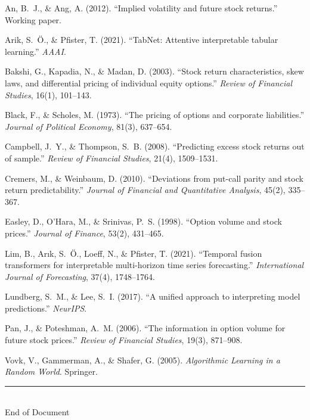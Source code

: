\documentclass[11pt,a4paper]{article}
\begin{document}
\begin{enumerate}[nosep, label={[\arabic*]}]
    \item An, B.~J., \& Ang, A. (2012). ``Implied volatility and future stock returns.'' Working paper.
    \item Arik, S.~\"O., \& Pfister, T. (2021). ``TabNet: Attentive interpretable tabular learning.'' \textit{AAAI}.
    \item Bakshi, G., Kapadia, N., \& Madan, D. (2003). ``Stock return characteristics, skew laws, and differential pricing of individual equity options.'' \textit{Review of Financial Studies}, 16(1), 101--143.
    \item Black, F., \& Scholes, M. (1973). ``The pricing of options and corporate liabilities.'' \textit{Journal of Political Economy}, 81(3), 637--654.
    \item Campbell, J.~Y., \& Thompson, S.~B. (2008). ``Predicting excess stock returns out of sample.'' \textit{Review of Financial Studies}, 21(4), 1509--1531.
    \item Cremers, M., \& Weinbaum, D. (2010). ``Deviations from put-call parity and stock return predictability.'' \textit{Journal of Financial and Quantitative Analysis}, 45(2), 335--367.
    \item Easley, D., O'Hara, M., \& Srinivas, P.~S. (1998). ``Option volume and stock prices.'' \textit{Journal of Finance}, 53(2), 431--465.
    \item Lim, B., Ar\i k, S.~\"O., Loeff, N., \& Pfister, T. (2021). ``Temporal fusion transformers for interpretable multi-horizon time series forecasting.'' \textit{International Journal of Forecasting}, 37(4), 1748--1764.
    \item Lundberg, S.~M., \& Lee, S.~I. (2017). ``A unified approach to interpreting model predictions.'' \textit{NeurIPS}.
    \item Pan, J., \& Poteshman, A.~M. (2006). ``The information in option volume for future stock prices.'' \textit{Review of Financial Studies}, 19(3), 871--908.
    \item Vovk, V., Gammerman, A., \& Shafer, G. (2005). \textit{Algorithmic Learning in a Random World}. Springer.
\end{enumerate}

\vspace{1cm}
\begin{center}
\textcolor{metu}{\rule{0.5\textwidth}{1pt}}\\[0.5cm]
{\large\textcolor{metu}{End of Document}}
\end{center}
\end{document}
